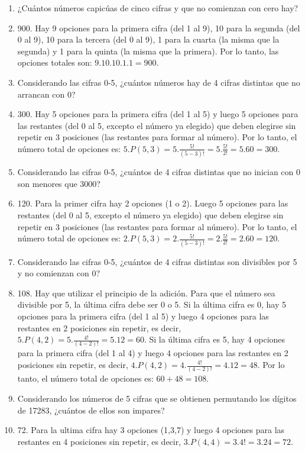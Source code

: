 \documentclass[a4paper]{article}
\newcommand{\answer}{\item[**]}
\begin{document}
\begin{enumerate}
\begin{enumerate} [label=(\alph*)]
		\item ¿Cuántos números capicúas de cinco cifras y que no comienzan con cero hay?
		\answer 900. Hay 9 opciones para la primera cifra (del 1 al 9), 10 para la segunda (del 0 al 9), 10 para la tercera (del 0 al 9), 1 para la cuarta (la misma que la segunda) y 1 para la quinta (la misma que la primera). Por lo tanto, las opciones totales son: $9.10.10.1.1=900$.

		\item Considerando las cifras 0-5, ¿cuántos números hay de 4 cifras distintas que no arrancan con 0?
		\answer 300. Hay 5 opciones para la primera cifra (del 1 al 5) y luego 5 opciones para las restantes (del 0 al 5, excepto el número ya elegido) que deben elegirse sin repetir en 3 posiciones (las restantes para formar al número). Por lo tanto, el número total de opciones es: $5.P(5,3)= 5. \frac{5!}{(5-3)!}= 5. \frac{5!}{2!} = 5.60=300$.

		\item Considerando las cifras 0-5, ¿cuántos de 4 cifras distintas que no inician con 0 son menores que 3000?
		\answer 120. Para la primer cifra hay 2 opciones (1 o 2). Luego 5 opciones para las restantes (del 0 al 5, excepto el número ya elegido) que deben elegirse sin repetir en 3 posiciones (las restantes para formar al número). Por lo tanto, el número total de opciones es: $2.P(5,3)= 2. \frac{5!}{(5-3)!}= 2. \frac{5!}{2!} = 2.60=120$.

		\item Considerando las cifras 0-5, ¿cuántos de 4 cifras distintas son divisibles por 5 y no comienzan con 0?
		\answer 108. Hay que utilizar el principio de la adición. Para que el número sea divisible por 5, la última cifra debe ser 0 o 5. Si la última cifra es 0, hay 5 opciones para la primera cifra (del 1 al 5) y luego 4 opciones para las restantes en 2 posiciones sin repetir, es decir, $5.P(4,2)=5.\frac{4!}{(4-2)!}=5.12=60$. Si la última cifra es 5, hay 4 opciones para la primera cifra (del 1 al 4) y luego 4 opciones para las restantes en 2 posiciones sin repetir, es decir, $4.P(4,2)=4.\frac{4!}{(4-2)!}=4.12=48$. Por lo tanto, el número total de opciones es: $60+48=108$.

		\item Considerando los números de 5 cifras que se obtienen permutando los dígitos de 17283, ¿cuántos de ellos son impares?
		\answer 72. Para la ultima cifra hay 3 opciones (1,3,7) y luego 4 opciones para las restantes en 4 posiciones sin repetir, es decir, $3.P(4,4)=3.4!=3.24=72$.


\end{enumerate}
\end{enumerate}
\end{document}
